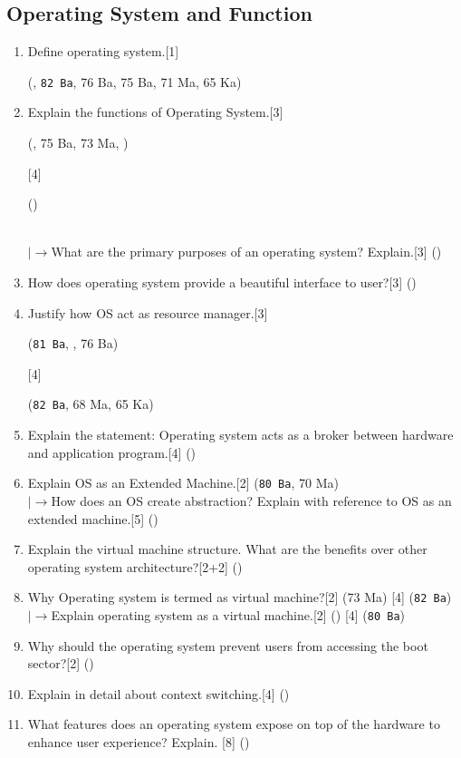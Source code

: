 \documentclass[12pt]{article}
\newcommand{\lb}{\\$\left|\rightarrow\right.$}
\begin{document}
	\subsection{Operating System and Function}
	\begin{enumerate}
	\item Define operating system.\hfill[1] \begin{footnotesize}(, \texttt{82 Ba}, 76 Ba, 75 Ba, 71 Ma, 65 Ka)\end{footnotesize}
	\item Explain the functions of Operating System.\hfill[3] \begin{footnotesize}(, 75 Ba, 73 Ma, )\end{footnotesize} [4] \begin{footnotesize}()\end{footnotesize} 
	\lb What are the primary purposes of an operating system? Explain.\hfill[3] ()
	\item How does operating system provide a beautiful interface to user?\hfill[3] ()
	\item Justify how OS act as resource manager.\hfill[3]\begin{small} (\texttt{81 Ba}, , 76 Ba)\end{small} [4]\begin{small} (\texttt{82 Ba}, 68 Ma, 65 Ka)\end{small}
	\item Explain the statement: Operating system acts as a broker between hardware and application program.\hfill[4] ()
	\item Explain OS as an Extended Machine.\hfill[2] (\texttt{80 Ba}, 70 Ma)
	\lb How does an OS create abstraction? Explain with reference to OS as an extended machine.\hspace{13.4cm}[5] ()
	\item Explain the virtual machine structure. What are the benefits over other operating system architecture?\hfill[2+2] ()
	\item Why Operating system is termed as virtual machine?\hfill[2] (73 Ma) [4] (\texttt{82 Ba})
	\lb Explain operating system as a virtual machine.\hfill[2] () [4] (\texttt{80 Ba})

	\item Why should the operating system prevent users from accessing the boot sector?\hfill[2] ()
	\item Explain in detail about context switching.\hfill[4] ()
	\item What features does an operating system expose on top of the hardware to enhance user experience? Explain. \hfill[8] ()
	\end{enumerate}
\end{document}
